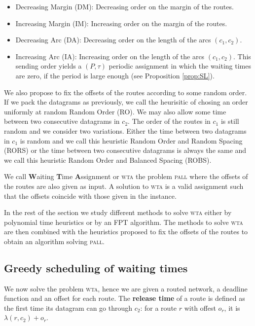 \documentclass[a4paper,10pt]{article}
\newcommand\pall{\textsc{pall}\xspace}
\newcommand\wta{\textsc{wta}\xspace}
\begin{document}
	\begin{itemize}
	 \item Decreasing Margin (DM): Decreasing order on the margin of the routes.
	 \item Increasing Margin (IM): Increasing order on the margin of the routes. 
	 \item Decreasing Arc (DA): Decreasing order on the length of the arcs $(c_1,c_2)$.
	 \item Increasing Arc (IA): Increasing order on the length of the arcs $(c_1,c_2)$. This sending order yields a $(P,\tau)$ periodic assignment in which the waiting times are zero, if the period is large enough (see Proposition \ref{prop:SL}).
	\end{itemize}

    We also propose to fix the offsets of the routes according to some random order.
    If we pack the datagrams as previously, we call the heurisitic of chosing an order
    uniformly at random Random Order (RO). We may also allow some time between two consecutive datagrams in $c_2$. The order of the routes in $c_1$ is still random and we consider two variations. Either the time between two datagrams in $c_1$ is random and we call this heuristic Random Order and Random Spacing (RORS) or the time between two consecutive datagrams is always the same and we call this heuristic Random Order and Balanced Spacing (ROBS).
 	
 	We call \textbf{W}aiting \textbf{T}ime \textbf{A}ssignment or \wta the problem \pall where the offsets of the routes are also given as input. A solution to \wta
 	is a valid assignment such that the offsets coincide with those given in the instance. 

   In the rest of the section we study different methods to solve \wta either by polynomial time heuristics or by an FPT algorithm. The methods to solve \wta are then combined with the heuristics proposed to fix the offsets of the routes to obtain an algorithm solving \pall.  
   
   \subsection{Greedy scheduling of waiting times}

   We now solve the problem \wta, hence we are given a routed network, a deadline function and an offset for each route. The \textbf{release time} of a route is defined as the first time its datagram can go through $c_2$: for a route $r$ with offest $o_r$, it is $\lambda(r,c_2) + o_r$.
\end{document}
